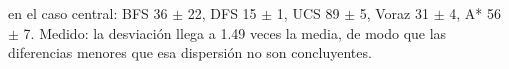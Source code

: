 {en el caso central: BFS 36 $\pm$ 22, DFS 15 $\pm$ 1, UCS 89 $\pm$ 5, Voraz 31 $\pm$ 4, A* 56 $\pm$ 7.}
{Medido: la desviación llega a 1.49 veces la media, de modo que las diferencias menores que esa dispersión no son concluyentes.}
